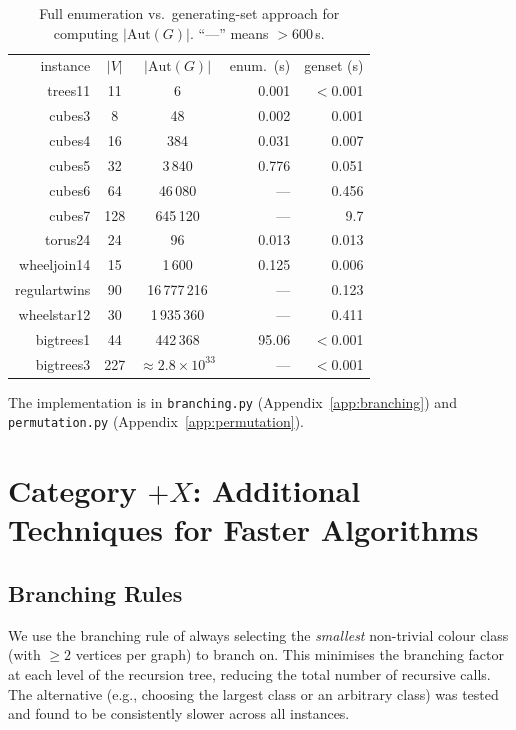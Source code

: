 \documentclass[twoside]{article}
\begin{document}
\begin{table}[H]
\centering
\begin{tabular}{r|c|c|r|r}
instance & $|V|$ & $|\text{Aut}(G)|$ & enum.\ (s) & genset (s) \\
\noalign{\smallskip}\hline\hline\noalign{\smallskip}
trees11        &  11 &           6 &  0.001 & $<$0.001 \\
cubes3         &   8 &          48 &  0.002 & 0.001 \\
cubes4         &  16 &         384 &  0.031 & 0.007 \\
cubes5         &  32 &       3\,840 &  0.776 & 0.051 \\
cubes6         &  64 &      46\,080 &  --- & 0.456 \\
cubes7         & 128 &     645\,120 &  --- & 9.7 \\
torus24        &  24 &          96 &  0.013 & 0.013 \\
wheeljoin14    &  15 &       1\,600 &  0.125 & 0.006 \\
regulartwins   &  90 &  16\,777\,216 &  --- & 0.123 \\
wheelstar12    &  30 &   1\,935\,360 &  --- & 0.411 \\
bigtrees1      &  44 &     442\,368 & 95.06 & $<$0.001 \\
bigtrees3      & 227 & $\approx 2.8 \times 10^{33}$ & --- & $<$0.001 \\
\end{tabular}
\caption{Full enumeration vs.\ generating-set approach for computing $|\text{Aut}(G)|$. ``---'' means $>600$\,s.}
\label{tab:genset}
\end{table}

The implementation is in \texttt{branching.py} (Appendix~\ref{app:branching}) and \texttt{permutation.py} (Appendix~\ref{app:permutation}).

\section{Category $+X$: Additional Techniques for Faster Algorithms}

\subsection{Branching Rules}

We use the branching rule of always selecting the \emph{smallest} non-trivial colour class (with $\geq 2$ vertices per graph) to branch on. This minimises the branching factor at each level of the recursion tree, reducing the total number of recursive calls. The alternative (e.g., choosing the largest class or an arbitrary class) was tested and found to be consistently slower across all instances.
\end{document}
